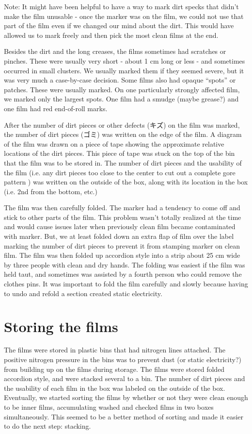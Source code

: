 \documentclass{article}
\begin{document}
Note: It might have been helpful to have a way to mark dirt specks that didn't make the film unusable - once the marker was on the film, we could not use that part of the film even if we changed our mind about the dirt. This would have allowed us to mark freely and then pick the most clean films at the end. 

Besides the dirt and the long creases, the films sometimes had scratches or pinches. These were usually very short - about 1 cm long or less - and sometimes occurred in small clusters. We usually marked them if they seemed severe, but it was very much a case-by-case decision.  Some films also had opaque ``spots'' or patches. These were usually marked. On one particularly strongly affected film, we marked only the largest spots. One film had a smudge (maybe grease?) and one film had red end-of-roll marks. 

After the number of dirt pieces or other defects (キズ)  on the film was marked, the number of dirt pieces (ゴミ) was written on the edge of the film. A diagram of the film was drawn on a piece of tape showing the approximate relative locations of the dirt pieces.  This piece of tape was stuck on the top of the bin that the film was to be stored in. The number of dirt pieces and the usability of the film (i.e. any dirt pieces too close to the center to cut out a complete gore pattern ) was written on the outside of the box, along with its location in the box (i.e. 2nd from the bottom, etc.) 

The film was then carefully folded. The marker had a tendency to come off and stick to other parts of the film. This problem wasn't totally realized at the time and would cause issues later when previously clean film became contaminated with marker. But, we at least folded down an extra flap of film over the label marking the number of dirt pieces to prevent it from stamping marker on clean film. The film was then folded up accordion style into a strip about 25 cm wide by three people with clean and dry hands. The folding was easiest if the film was held taut, and sometimes was assisted by a fourth person who could remove the clothes pins. It was important to fold the film carefully and slowly because having to undo and refold a section created static electricity. 

\section{Storing the films}
The films were stored in plastic bins that had nitrogen lines attached. The positive nitrogen pressure in the bins was to prevent dust  (or static electricity?) from building up on the films during storage. %
The films were stored folded accordion style, and were stacked several to a bin. The number of dirt pieces and the usability of each film in the box was labeled on the outside of the box. Eventually, we started sorting the films by whether or not they were clean enough to be inner films, accumulating washed and checked films in two boxes simultaneously.  This seemed to be a better method of sorting and made it easier to do the next step: stacking. 
\end{document}
